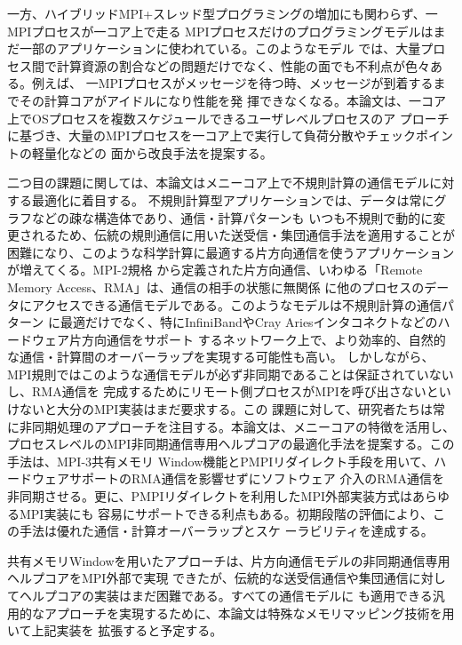 一方、ハイブリッドMPI+スレッド型プログラミングの増加にも関わらず、一MPIプロセスが一コア上で走る
MPIプロセスだけのプログラミングモデルはまだ一部のアプリケーションに使われている。このようなモデル
では、大量プロセス間で計算資源の割合などの問題だけでなく、性能の面でも不利点が色々ある。例えば、
一MPIプロセスがメッセージを待つ時、メッセージが到着するまでその計算コアがアイドルになり性能を発
揮できなくなる。本論文は、一コア上でOSプロセスを複数スケジュールできるユーザレベルプロセスのア
プローチに基づき、大量のMPIプロセスを一コア上で実行して負荷分散やチェックポイントの軽量化などの
面から改良手法を提案する。

二つ目の課題に関しては、本論文はメニーコア上で不規則計算の通信モデルに対する最適化に着目する。
不規則計算型アプリケーションでは、データは常にグラフなどの疎な構造体であり、通信・計算パターンも
いつも不規則で動的に変更されるため、伝統の規則通信に用いた送受信・集団通信手法を適用することが
困難になり、このような科学計算に最適する片方向通信を使うアプリケーションが増えてくる。MPI-2規格
から定義された片方向通信、いわゆる「Remote Memory Access、RMA」は、通信の相手の状態に無関係
に他のプロセスのデータにアクセスできる通信モデルである。このようなモデルは不規則計算の通信パターン
に最適だけでなく、特にInfiniBandやCray Ariesインタコネクトなどのハードウェア片方向通信をサポート
するネットワーク上で、より効率的、自然的な通信・計算間のオーバーラップを実現する可能性も高い。
しかしながら、MPI規則ではこのような通信モデルが必ず非同期であることは保証されていないし、RMA通信を
完成するためにリモート側プロセスがMPIを呼び出さないといけないと大分のMPI実装はまだ要求する。この
課題に対して、研究者たちは常に非同期処理のアプローチを注目する。本論文は、メニーコアの特徴を活用し、
プロセスレベルのMPI非同期通信専用ヘルプコアの最適化手法を提案する。この手法は、MPI-3共有メモリ
Window機能とPMPIリダイレクト手段を用いて、ハードウェアサポートのRMA通信を影響せずにソフトウェア
介入のRMA通信を非同期させる。更に、PMPIリダイレクトを利用したMPI外部実装方式はあらゆるMPI実装にも
容易にサポートできる利点もある。初期段階の評価により、この手法は優れた通信・計算オーバーラップとスケ
ーラビリティを達成する。

共有メモリWindowを用いたアプローチは、片方向通信モデルの非同期通信専用ヘルプコアをMPI外部で実現
できたが、伝統的な送受信通信や集団通信に対してヘルプコアの実装はまだ困難である。すべての通信モデルに
も適用できる汎用的なアプローチを実現するために、本論文は特殊なメモリマッピング技術を用いて上記実装を
拡張すると予定する。
